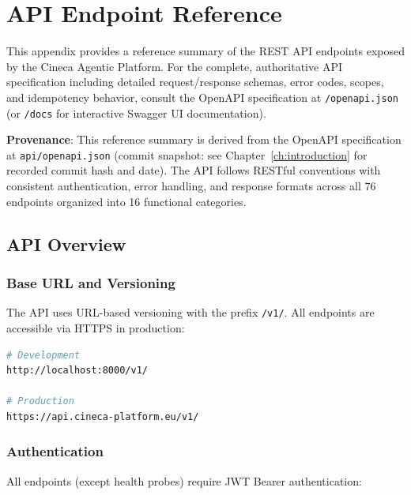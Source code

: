 
\chapter{API Endpoint Reference}
\label{app:api-reference}

This appendix provides a reference summary of the REST API endpoints exposed by the Cineca Agentic Platform. For the complete, authoritative API specification including detailed request/response schemas, error codes, scopes, and idempotency behavior, consult the OpenAPI specification at \texttt{/openapi.json} (or \texttt{/docs} for interactive Swagger UI documentation).

\textbf{Provenance}: This reference summary is derived from the OpenAPI specification at \texttt{api/openapi.json} (commit snapshot: see Chapter~\ref{ch:introduction} for recorded commit hash and date). The API follows RESTful conventions with consistent authentication, error handling, and response formats across all 76 endpoints organized into 16 functional categories.

\section{API Overview}
\label{app:api:overview}

\subsection{Base URL and Versioning}

The API uses URL-based versioning with the prefix \texttt{/v1/}. All endpoints are accessible via HTTPS in production:

\begin{lstlisting}[language=bash]
# Development
http://localhost:8000/v1/

# Production
https://api.cineca-platform.eu/v1/
\end{lstlisting}

\subsection{Authentication}

All endpoints (except health probes) require JWT Bearer authentication:

